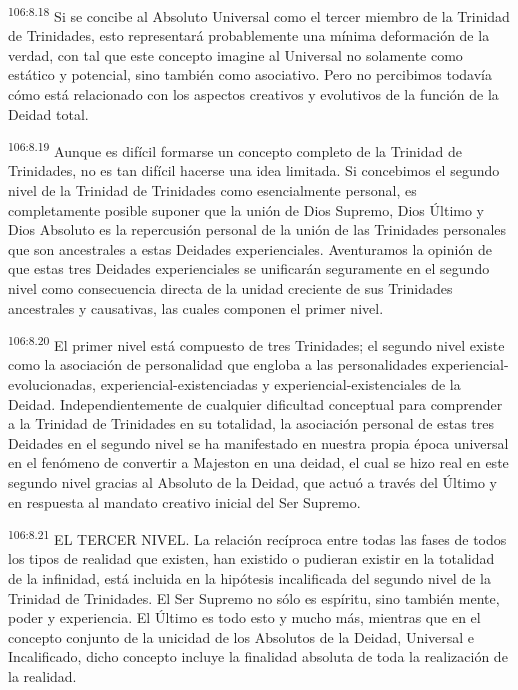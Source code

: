 \documentclass[twoside, 11pt]{book}
\begin{document}
\par
\textsuperscript{106:8.18} Si se concibe al Absoluto Universal como el tercer miembro de la Trinidad de Trinidades, esto representará probablemente una mínima deformación de la verdad, con tal que este concepto imagine al Universal no solamente como estático y potencial, sino también como asociativo. Pero no percibimos todavía cómo está relacionado con los aspectos creativos y evolutivos de la función de la Deidad total.

\par
\textsuperscript{106:8.19} Aunque es difícil formarse un concepto completo de la Trinidad de Trinidades, no es tan difícil hacerse una idea limitada. Si concebimos el segundo nivel de la Trinidad de Trinidades como esencialmente personal, es completamente posible suponer que la unión de Dios Supremo, Dios Último y Dios Absoluto es la repercusión personal de la unión de las Trinidades personales que son ancestrales a estas Deidades experienciales. Aventuramos la opinión de que estas tres Deidades experienciales se unificarán seguramente en el segundo nivel como consecuencia directa de la unidad creciente de sus Trinidades ancestrales y causativas, las cuales componen el primer nivel.

\par
\textsuperscript{106:8.20} El primer nivel está compuesto de tres Trinidades; el segundo nivel existe como la asociación de personalidad que engloba a las personalidades experiencial-evolucionadas, experiencial-existenciadas y experiencial-existenciales de la Deidad. Independientemente de cualquier dificultad conceptual para comprender a la Trinidad de Trinidades en su totalidad, la asociación personal de estas tres Deidades en el segundo nivel se ha manifestado en nuestra propia época universal en el fenómeno de convertir a Majeston en una deidad, el cual se hizo real en este segundo nivel gracias al Absoluto de la Deidad, que actuó a través del Último y en respuesta al mandato creativo inicial del Ser Supremo.

\par
\textsuperscript{106:8.21} EL TERCER NIVEL. La relación recíproca entre todas las fases de todos los tipos de realidad que existen, han existido o pudieran existir en la totalidad de la infinidad, está incluida en la hipótesis incalificada del segundo nivel de la Trinidad de Trinidades. El Ser Supremo no sólo es espíritu, sino también mente, poder y experiencia. El Último es todo esto y mucho más, mientras que en el concepto conjunto de la unicidad de los Absolutos de la Deidad, Universal e Incalificado, dicho concepto incluye la finalidad absoluta de toda la realización de la realidad.
\end{document}
